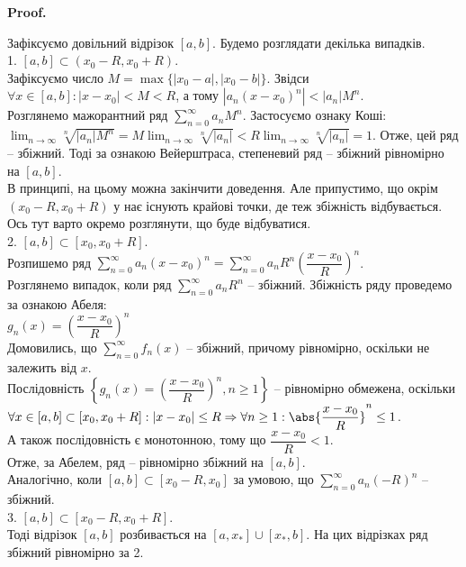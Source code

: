\documentclass[a4paper, 10pt]{article}
\makeatletter
\def\huge{\displaystyle}
\theoremstyle{theoremdd}
\theoremstyle{theoremdd}
\theoremstyle{theoremdd}
\theoremstyle{theoremdd}
\theoremstyle{theoremdd}
\theoremstyle{theoremdd}
\theoremstyle{theoremdd}
\theoremstyle{theoremdd}
\theoremstyle{theoremdd}
\renewenvironment{proof}[1][Proof.\\]{\par
\pushQED{\hfill \qed}%
\normalfont \topsep6\p@\@plus6\p@\relax
\trivlist
\item\relax
{\bfseries
#1\@addpunct{.}}\hspace\labelsep\ignorespaces
}{%
\popQED\endtrivlist\@endpefalse
}
\makeatother
\begin{document}
\begin{proof}
Зафіксуємо довільний відрізок $[a,b]$. Будемо розглядати декілька випадків.\\
1. $[a,b] \subset (x_0-R,x_0+R)$.\\
Зафіксуємо число $M = \max\{|x_0-a|,|x_0-b|\}$. Звідси $\forall x \in [a,b]: |x-x_0| < M < R$, а тому $|a_n(x-x_0)^n| < |a_n| M^n$.\\
Розглянемо мажорантний ряд $\huge \sum_{n=0}^\infty a_n M^n$. Застосуємо ознаку Коші:\\
$\huge \lim_{n \to \infty} \sqrt[n]{|a_n| M^n} = M \lim_{n \to \infty} \sqrt[n]{|a_n|} < R \lim_{n \to \infty} \sqrt[n]{|a_n|} = 1$.
Отже, цей ряд -- збіжний. Тоді за ознакою Вейерштраса, степеневий ряд -- збіжний рівномірно на $[a,b]$.
\bigskip \\
В принципі, на цьому можна закінчити доведення. Але припустимо, що окрім $(x_0-R,x_0+R)$ у нає існують крайові точки, де теж збіжність відбувається. Ось тут варто окремо розглянути, що буде відбуватися.\\
2. $[a,b] \subset [x_0,x_0+R]$.\\
Розпишемо ряд $\huge \sum_{n=0}^\infty a_n(x-x_0)^n = \sum_{n=0}^\infty a_n R^n \left( \dfrac{x-x_0}{R} \right)^n$.\\
Розглянемо випадок, коли ряд $\huge \sum_{n=0}^\infty a_n R^n$ -- збіжний. Збіжність ряду проведемо за ознакою Абеля:\\
$g_n(x) = \left( \dfrac{x-x_0}{R} \right)^n$\\
Домовились, що $\huge \sum_{n=0}^\infty f_n(x)$ -- збіжний, причому рівномірно, оскільки не залежить від $x$.\\
Послідовність $\left\{ g_n(x) = \left( \dfrac{x-x_0}{R} \right)^n, n \geq 1 \right\}$ -- рівномірно обмежена, оскільки\\
$\forall x \in [a,b] \subset [x_0, x_0+R]: |x - x_0| \leq R \Rightarrow \forall n \geq 1: \abs{\dfrac{x-x_0}{R}}^n \leq 1$.\\
А також послідовність є монотонною, тому що $\dfrac{x-x_0}{R} < 1$.\\
Отже, за Абелем, ряд -- рівномірно збіжний на $[a,b]$.
\bigskip \\
Аналогічно, коли $[a,b] \subset [x_0-R, x_0]$ за умовою, що $\huge \sum_{n=0}^\infty a_n (-R)^n$ -- збіжний.
\bigskip \\
3. $[a,b] \subset [x_0-R,x_0+R]$.\\
Тоді відрізок $[a,b]$ розбивається на $[a,x_*] \cup [x_*,b]$. На цих відрізках ряд збіжний рівномірно за 2.
\end{proof}
\end{document}
